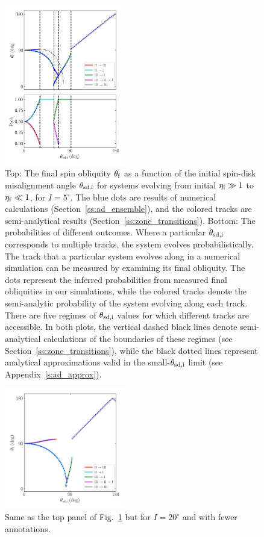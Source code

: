 \documentclass[twocolumn,twocolappendix]{aastex63}
\begin{document}
\begin{figure}
    \centering
    \includegraphics[width=0.47\textwidth]{plots_diskdisp/3_ensemble_05_35.png}
    \caption{Top: The final spin obliquity $\theta_{\rm f}$ as a function of the
    initial spin-disk misalignment angle $\theta_{\rm sd, i}$ for systems
    evolving from initial $\eta_{\rm i} \gg 1$ to $\eta_{\rm f} \ll 1$,
    for $I = 5^\circ$. The blue dots are results of numerical
    calculations (Section~\ref{ss:ad_ensemble}), and the colored tracks are
    semi-analytical results (Section~\ref{ss:zone_transitions}). Bottom: The
    probabilities of different outcomes. Where a particular $\theta_{\rm sd, i}$
    corresponds to multiple tracks, the system evolves probabilistically. The
    track that a particular system evolves along in a numerical simulation can
    be measured by examining its final obliquity. The dots represent the
    inferred probabilities from measured final obliquities in our simulations,
    while the colored tracks denote the semi-analytic probability of the system
    evolving along each track. There are five regimes of $\theta_{\rm sd, i}$
    values for which different tracks are accessible. In both plots, the
    vertical dashed black lines denote semi-analytical calculations of the
    boundaries of these regimes (see Section~\ref{ss:zone_transitions}), while
    the black dotted lines represent analytical approximations valid in the
    small-$\theta_{\rm sd, i}$ limit (see
    Appendix~\ref{s:ad_approx}).}\label{fig:ad_ensemble}
\end{figure}
\begin{figure}
    \centering
    \includegraphics[width=0.47\textwidth]{plots_diskdisp/3_ensemble_20_35.png}
    \caption{Same as the top panel of Fig.~\ref{fig:ad_ensemble} but for $I
    = 20^\circ$ and with fewer annotations.}\label{fig:3_ensemble_20_35}
\end{figure}
\end{document}
